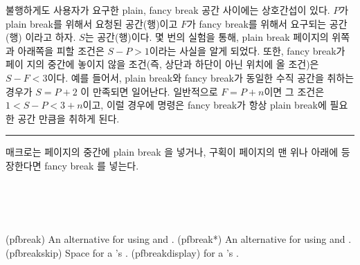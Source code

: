 불행하게도 사용자가 요구한 plain, fancy break 공간 사이에는 상호간섭이 있다. $ P $가
plain break를 위해서 요청된 공간(행)이고 $ F $가 fancy break를 위해서 요구되는 공간(행)
이라고 하자. $ S $는  공간(행)이다. 몇 번의 실험을 통해, plain break 페이지의 위쪽
과 아래쪽을 피할 조건은 $ S −P > 1 $이라는 사실을 알게 되었다. 또한, fancy break가 페이
지의 중간에 놓이지 않을 조건(즉, 상단과 하단이 아닌 위치에 올 조건)은 $ S − F < 3 $이다.
예를 들어서, plain break와 fancy break가 동일한 수직 공간을 취하는 경우가 $ S = P + 2 $
이 만족되면 일어난다. 일반적으로 $ F = P +n $이면 그 조건은 $ 1 < S −P < 3+n $이고, 이럴
경우에 \cmd{\plainfancybreak} 명령은 fancy break가 항상 plain break에 필요한 공간 만큼을
취하게 된다.


\fancybreak{\pfbreakdisplay}

\cmd{\plainfancybreak} 매크로는 페이지의 중간에 plain break 을 넣거나,
구획이 페이지의 맨 위나 아래에 등장한다면 fancy break 를 넣는다.

\begin{syntax}
\cmd{\pfbreak} \cmd{\pfbreak*} \\
\lnc{\pfbreakskip} \\
\cmd{\pfbreakdisplay} \\
\end{syntax}
\glossary(pfbreak)
  {}%
  {An alternative for  using  
   and .}
\glossary(pfbreak*)
  {}%
  {An alternative for  using  
   and .}
\glossary(pfbreakskip)%
  {}%
  {Space for a 's .}
\glossary(pfbreakdisplay)%
  {}%
  { for a 's .}
  
